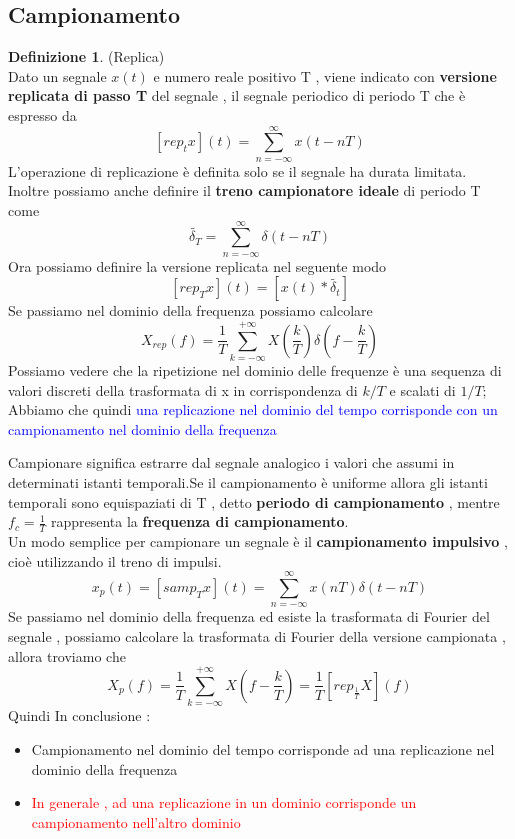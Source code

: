 \documentclass{article}
\theoremstyle{definition}
\newtheorem*{definizione}{Definizione}
\newcommand{\suminf}{\sum_{n=-\infty}^{\infty}}
\begin{document}
	\subsection{Campionamento}
	\begin{definizione}(Replica)\\
		Dato un segnale $x(t)$ e numero reale positivo T , viene indicato con \textbf{versione replicata di passo T} del segnale , il segnale periodico di periodo T che è espresso da 
		$$[rep_tx](t)=\sum_{n=-\infty}^{\infty}x(t-nT)$$
		L'operazione di replicazione è definita solo se il segnale ha durata limitata.\\
		Inoltre possiamo anche definire il \textbf{treno campionatore ideale} di periodo T come 
		$$\widetilde{\delta_T}=\sum_{n=-\infty}^{\infty}\delta(t-nT)$$ 
		Ora possiamo definire la versione replicata nel seguente modo 
		$$[rep_Tx](t)=[x(t)*\widetilde{\delta_t}]$$
		Se passiamo nel dominio della frequenza possiamo calcolare $$X_{rep}(f)=\frac{1}{T}\sum_{k=-\infty}^{+\infty} X\left(\frac{k}{T}\right)\delta\left(f-\frac{k}{T}\right)$$
		Possiamo vedere che la ripetizione nel dominio delle frequenze è una sequenza di valori discreti della trasformata di x in corrispondenza di $k/T$ e scalati di $1/T$;
		Abbiamo che quindi \textcolor{blue}{una replicazione nel dominio del tempo corrisponde con un campionamento nel dominio della frequenza}
	\end{definizione}
	Campionare significa estrarre dal segnale analogico i valori che assumi in determinati istanti temporali.Se il campionamento è uniforme allora gli istanti temporali sono equispaziati di T , detto \textbf{periodo di campionamento} , mentre $f_c=\frac{1}{T}$ rappresenta la \textbf{frequenza di campionamento}.\\
	Un modo semplice per campionare un segnale è il \textbf{campionamento impulsivo} , cioè utilizzando il treno di impulsi. 
	$$x_p(t)=[samp_Tx](t)=\suminf x(nT)\delta(t-nT)$$
	Se passiamo nel dominio della frequenza ed esiste la trasformata di Fourier del segnale , possiamo calcolare la trasformata di Fourier della versione campionata , allora troviamo che 
	$$X_p(f)=\frac{1}{T} \sum_{k=-\infty}^{+\infty} X(f-\frac{k}{T})=\frac{1}{T}[rep_{\frac{1}{T}}X](f)$$
Quindi In conclusione : 
\begin{itemize}
	\item Campionamento nel dominio del tempo corrisponde ad una replicazione nel dominio della frequenza 
	\item\textcolor{red}{ In generale , ad una replicazione in un dominio corrisponde un campionamento nell'altro dominio}
\end{itemize}
\end{document}

